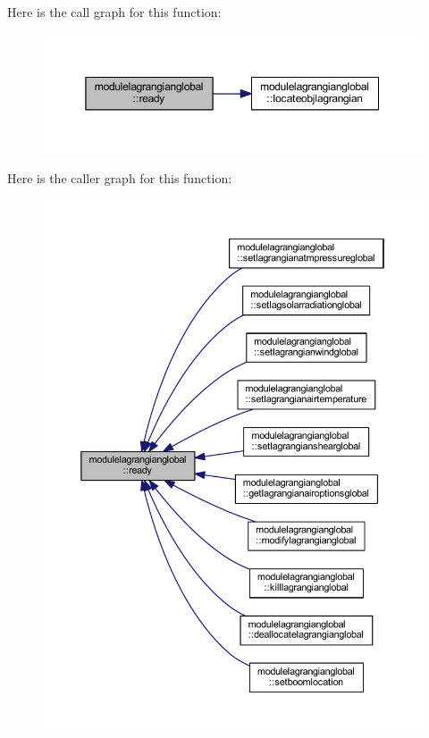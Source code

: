 Here is the call graph for this function\+:\nopagebreak
\begin{figure}[H]
\begin{center}
\leavevmode
\includegraphics[width=350pt]{namespacemodulelagrangianglobal_ab75b97011a170683ac68816525771168_cgraph}
\end{center}
\end{figure}
Here is the caller graph for this function\+:\nopagebreak
\begin{figure}[H]
\begin{center}
\leavevmode
\includegraphics[width=350pt]{namespacemodulelagrangianglobal_ab75b97011a170683ac68816525771168_icgraph}
\end{center}
\end{figure}
\mbox{\label{namespacemodulelagrangianglobal_a83377eb734750e27543838294b2cf44d}} 
